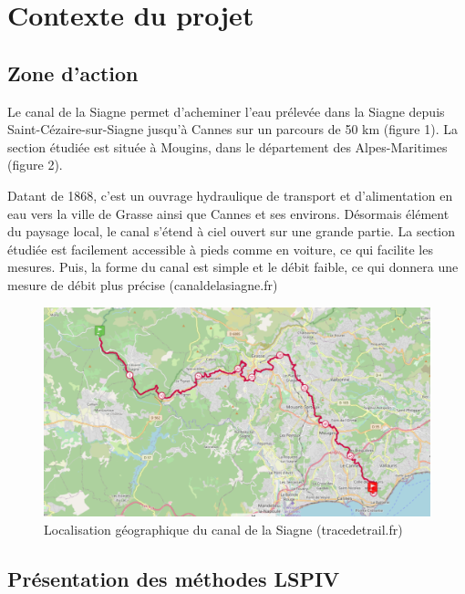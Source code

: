 \documentclass[
]{article}
\begin{document}
\hypertarget{contexte-du-projet}{%
\section{Contexte du projet}\label{contexte-du-projet}}

\hypertarget{zone-daction}{%
\subsection{Zone d'action}\label{zone-daction}}

Le canal de la Siagne permet d'acheminer l'eau prélevée dans la Siagne depuis Saint-Cézaire-sur-Siagne jusqu'à Cannes sur un parcours de 50 km (figure 1). La section étudiée est située à Mougins, dans le département des Alpes-Maritimes (figure 2).

Datant de 1868, c'est un ouvrage hydraulique de transport et d'alimentation en eau vers la ville de Grasse ainsi que Cannes et ses environs.
Désormais élément du paysage local, le canal s'étend à ciel ouvert sur une grande partie.
La section étudiée est facilement accessible à pieds comme en voiture, ce qui facilite les mesures. Puis, la forme du canal est simple et le débit faible, ce qui donnera une mesure de débit plus précise (canaldelasiagne.fr)



\begin{figure}
\includegraphics[width=1\linewidth]{images/siagne} \caption{Localisation géographique du canal de la Siagne (tracedetrail.fr)}\label{fig:unnamed-chunk-3}
\end{figure}

\hypertarget{pruxe9sentation-des-muxe9thodes-lspiv}{%
\subsection{Présentation des méthodes LSPIV}\label{pruxe9sentation-des-muxe9thodes-lspiv}}
\end{document}
